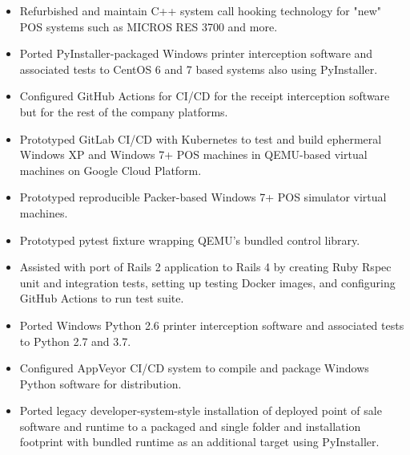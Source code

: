 \documentclass[10pt,letter,ragged2e]{altacv}
\begin{document}
\begin{paracol}{2}


\begin{itemize}
\item Refurbished and maintain C++ system call hooking technology for "new" POS systems such as MICROS RES 3700 and more.
\item Ported PyInstaller-packaged Windows printer interception software and associated tests to CentOS 6 and 7 based systems also using PyInstaller.
\item Configured GitHub Actions for CI/CD for the receipt interception software but for the rest of the company platforms.
\item Prototyped GitLab CI/CD with Kubernetes to test and build ephermeral Windows XP and Windows 7+ POS machines in QEMU-based virtual machines on Google Cloud Platform. 
\item Prototyped reproducible Packer-based Windows 7+ POS simulator virtual machines.
\item Prototyped pytest fixture wrapping QEMU's bundled control library. 
\item Assisted with port of Rails 2 application to Rails 4 by creating Ruby Rspec unit and integration tests, setting up testing Docker images, and configuring GitHub Actions to run test suite.
\item Ported Windows Python 2.6 printer interception software and associated tests to Python 2.7 and 3.7.
\item Configured AppVeyor CI/CD system to compile and package Windows Python software for distribution.
\item Ported legacy developer-system-style installation of deployed point of sale software and runtime to a packaged and single folder and installation footprint with bundled runtime as an additional target using PyInstaller.

\end{itemize}
\end{paracol}
\end{document}
